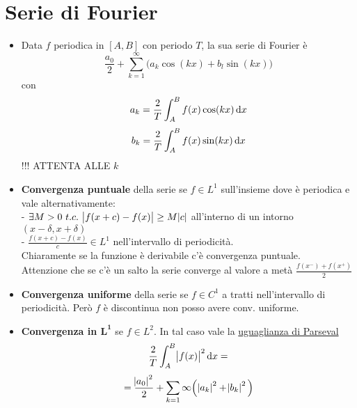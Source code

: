\documentclass[a4paper,portrait,columns=3,5pt]{cheatsheet}
\begin{document}
\section{Serie di Fourier}
\begin{itemize}
    \item Data $f$ periodica in $[A, B]$ con periodo $T$, la sua serie di Fourier è $$ \frac{a_0}{2} + \sum_{k=1}^{\infty} \Big (a_k \cos(kx) + b_l \sin(kx)\Big)$$ con $$ a_k = \frac{2}{T} \int_A^B f(x) \cos(kx) \dif x$$ $$ b_k = \frac{2}{T} \int_A^B f(x) \sin(kx) \dif x$$ !!! ATTENTA ALLE $k$
    \item \textbf{Convergenza puntuale} della serie se $f \in L^1$ sull'insieme dove è periodica e vale alternativamente:\\ - $\exists M> 0~t.c.~ \abs{f(x+c) - f(x)} \geq M\abs{c}$ all'interno di un intorno $(x - \delta, x + \delta)$\\ - $\frac{f(x+c) - f(x)}{c} \in L^1$ nell'intervallo di periodicità.\\
    Chiaramente se la funzione è derivabile c'è convergenza puntuale.\\
    Attenzione che se c'è un salto la serie converge al valore a metà $\frac{f(x^-) + f(x^+)}{2}$
    \item \textbf{Convergenza uniforme} della serie se $f\in C^1$ a tratti nell'intervallo di periodicità. Però $f$ è discontinua non posso avere conv. uniforme.
    \item \textbf{Convergenza in $\mathbf{L^1}$} se $f \in L^2$. In tal caso vale la \underline{uguaglianza di Parseval} $$ \frac 2 T \int_A^B \abs{f(x)}^2 \dif x = $$ $$ = \frac{\abs{a_0}^2}{2} +  \sum_{k=1}{\infty} \Big( \abs{a_k}^2 + \abs{b_k}^2 \Big)$$
\end{itemize}
\end{document}
